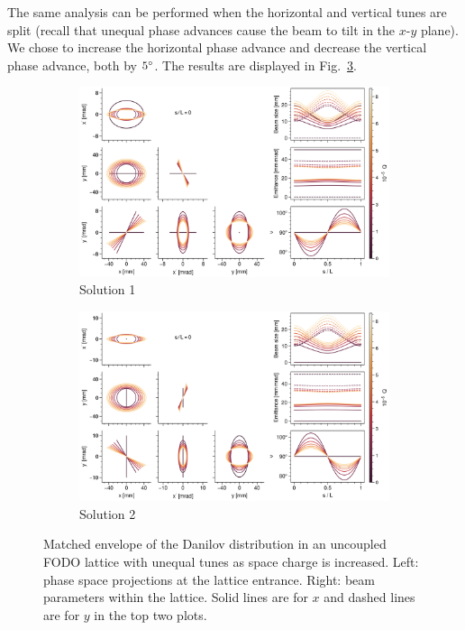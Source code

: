 The same analysis can be performed when the horizontal and vertical tunes are split (recall that unequal phase advances cause the beam to tilt in the $x$-$y$ plane). We chose to increase the horizontal phase advance and decrease the vertical phase advance, both by $5\degree$. The results are displayed in Fig.~\ref{fig:matched_vs_sc_fodo_split}. 
%
\begin{figure}[!p]
    \begin{subfigure}{1.0\textwidth}
        \includegraphics[width=\textwidth]{Images/chapter2/matched_vs_sc_fodo_split_mode1.png}
        \caption{Solution 1}
        \label{fig:matched_vs_sc_fodo_split_a}
    \end{subfigure}
    \vfill
    \vfill
    \begin{subfigure}{1.0\textwidth}
        \centering
        \includegraphics[width=\textwidth]{Images/chapter2/matched_vs_sc_fodo_split_mode2.png}
        \caption{Solution 2}
        \label{fig:matched_vs_sc_fodo_split_b}
    \end{subfigure}
    \caption{Matched envelope of the Danilov distribution in an uncoupled FODO lattice with unequal tunes as space charge is increased. Left: phase space projections at the lattice entrance. Right: beam parameters within the lattice. Solid lines are for $x$ and dashed lines are for $y$ in the top two plots.}
    \label{fig:matched_vs_sc_fodo_split}
\end{figure}
